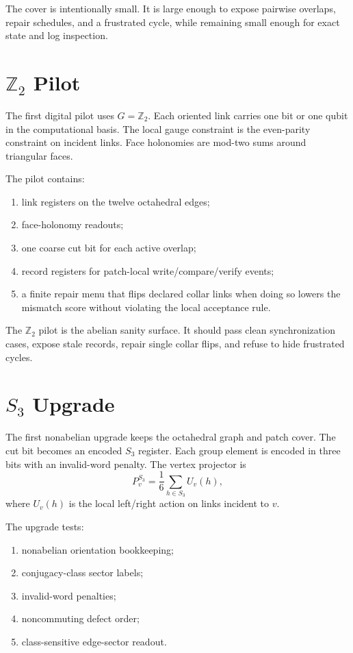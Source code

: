 \documentclass[11pt]{article}
\begin{document}
The cover is intentionally small. It is large enough to expose pairwise overlaps, repair
schedules, and a frustrated cycle, while remaining small enough for exact state and log
inspection.

\section{\(\mathbb Z_2\) Pilot}

The first digital pilot uses \(G=\mathbb Z_2\). Each oriented link carries one bit or one qubit
in the computational basis. The local gauge constraint is the even-parity constraint on incident
links. Face holonomies are mod-two sums around triangular faces.

The pilot contains:
\begin{enumerate}[leftmargin=2em]
\item link registers on the twelve octahedral edges;
\item face-holonomy readouts;
\item one coarse cut bit for each active overlap;
\item record registers for patch-local write/compare/verify events;
\item a finite repair menu that flips declared collar links when doing so lowers the mismatch
score without violating the local acceptance rule.
\end{enumerate}

The \(\mathbb Z_2\) pilot is the abelian sanity surface. It should pass clean synchronization
cases, expose stale records, repair single collar flips, and refuse to hide frustrated cycles.

\section{\(S_3\) Upgrade}

The first nonabelian upgrade keeps the octahedral graph and patch cover. The cut bit becomes an
encoded \(S_3\) register. Each group element is encoded in three bits with an invalid-word
penalty. The vertex projector is
\[
P_v^{S_3}=\frac{1}{6}\sum_{h\in S_3}U_v(h),
\]
where \(U_v(h)\) is the local left/right action on links incident to \(v\).

The upgrade tests:
\begin{enumerate}[leftmargin=2em]
\item nonabelian orientation bookkeeping;
\item conjugacy-class sector labels;
\item invalid-word penalties;
\item noncommuting defect order;
\item class-sensitive edge-sector readout.
\end{enumerate}
\end{document}
